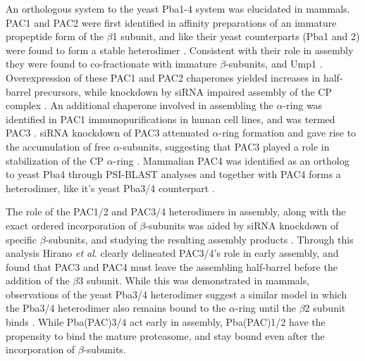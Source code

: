 	An orthologous system to the yeast Pba1-4 system was elucidated in mammals. PAC1 and PAC2 were first identified in affinity preparations of an immature propeptide form of the $\beta$1 subunit, and like their yeast counterparts (Pba1 and 2) were found to form a stable heterodimer \citep{hirano05}. Consistent with their role in assembly they were found to co-fractionate with immature $\beta$-subunits, and Ump1 \citep{hirano05}. Overexpression of these PAC1 and PAC2 chaperones yielded increases in half- barrel precursors, while knockdown by siRNA impaired assembly of the CP complex \citep{hirano05}. An additional chaperone involved in assembling the $\alpha$-ring was identified in PAC1 immunopurifications in human cell lines, and was termed PAC3 \citep{hirano06}. siRNA knockdown of PAC3 attenuated $\alpha$-ring formation and gave rise to the accumulation of free $\alpha$-subunits, suggesting that PAC3 played a role in stabilization of the CP $\alpha$-ring \citep{hirano06}. Mammalian PAC4 was identified as an ortholog to yeast Pba4 through PSI-BLAST analyses \citep{kusmierczyk08} and together with PAC4 forms a heterodimer, like it’s yeast Pba3/4 counterpart \citep{le07}.
	
	The role of the PAC1/2 and PAC3/4 heterodimers in assembly, along with the exact ordered incorporation of $\beta$-subunits was aided by siRNA knockdown of specific $\beta$-subunits, and studying the resulting assembly products \citep{hirano08}. Through this analysis Hirano \textit{et al}. clearly delineated PAC3/4’s role in early assembly, and found that PAC3 and PAC4 must leave the assembling half-barrel before the addition of the $\beta$3 subunit. While this was demonstrated in mammals, observations of the yeast Pba3/4 heterodimer suggest a similar model in which the Pba3/4 heterodimer also remains bound to the $\alpha$-ring until the $\beta$2 subunit binds \citep{kusmierczyk08, yashiroda08}. While Pba(PAC)3/4 act early in assembly, Pba(PAC)1/2 have the propensity to bind the mature proteasome, and stay bound even after the incorporation of $\beta$-subunits.
	
